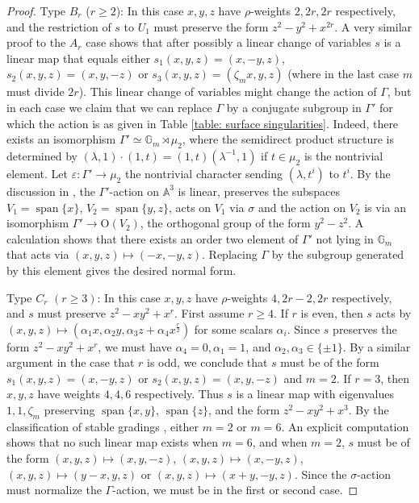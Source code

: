 \documentclass{article} %
\numberwithin{equation}{section}
\theoremstyle{definition}
\newcommand{\G}{\mathbb{G}}
\newcommand{\A}{\mathbb{A}}
\newcommand{\al}{\alpha}
\DeclareMathOperator{\spn}{span}
\newcommand{\rl}{r} %
\begin{document}
\begin{proof}
    
Type $B_\rl$ ($\rl \geq 2$):
In this case $x, y, z$ have $\rho$-weights $2, 2r, 2r$ respectively, and the restriction of $s$ to $U_1$ must preserve the form $z^2 - y^2 + x^{2r}$. 
A very similar proof to the $A_\rl$ case shows that after possibly a linear change of variables $s$ is a linear map that equals either $s_1(x,y,z) = (x,-y,z)$, $s_2(x,y,z) = (x,y,-z)$ or $s_3(x,y,z) = (\zeta_mx,y,z)$ (where in the last case $m$ must divide $2\rl$).
This linear change of variables might change the action of $\Gamma$, but in each case we claim that we can replace $\Gamma$ by a conjugate subgroup in $\Gamma'$ for which the action is as given in Table \ref{table: surface singularities}.
Indeed, there exists an isomorphism $\Gamma' \simeq\G_m \rtimes \mu_2$, where the semidirect product structure is determined by $(\lambda, 1) \cdot (1,t) = (1,t) (\lambda^{-1},1)$ if $t\in \mu_2$ is the nontrivial element.
Let $\varepsilon\colon \Gamma'\rightarrow \mu_2$ the nontrivial character sending $(\lambda, t^i)$ to $t^i$.
By the discussion in \cite[Section 8.4]{Slodowy-simplesingularitiesalggroups}, the $\Gamma'$-action on $\A^3$ is linear, preserves the subspaces $V_1=\spn\{x\}$, $V_2=\spn \{y,z\}$, acts on $V_1$ via $\sigma$ and the action on $V_2$ is via an isomorphism $\Gamma'\rightarrow \mathrm{O}(V_2)$, the orthogonal group of the form $y^2-z^2$. A calculation shows that there exists an order two element of $\Gamma'$ not lying in $\G_m$ that acts via $(x,y,z)\mapsto (-x,-y,z)$.
Replacing $\Gamma$ by the subgroup generated by this element gives the desired normal form. 

Type $C_\rl$ $(\rl\geq 3)$:
In this case $x, y, z$ have $\rho$-weights $4, 2r - 2, 2r$ respectively, and $s$ must preserve $z^2 - xy^2 + x^r$. First assume $r \geq 4$. If $r$ is even, then $s$ acts by $(x, y,z)\mapsto (\al_1 x,\al_2 y,\al_3 z + \al_4 x^{\frac{r}{2}})$ for some scalars $\alpha_i$.
Since $s$ preserves the form $z^2 - xy^2 + x^r$, we must have $\al_4 = 0, \al_1 = 1$, and $\al_2, \al_3 \in \{\pm 1\}$. 
By a similar argument in the case that $\rl$ is odd, we conclude that $s$ must be of the form 
$s_1(x,y,z) = (x,-y,z)$ or $s_2(x,y,z) = (x,y,-z)$ and $m=2$.
If $\rl=3$, then $x,y,z$ have weights $4,4,6$ respectively. 
Thus $s$ is a linear map with eigenvalues $1, 1, \zeta_m$ preserving $\spn\{x, y\}$, $\spn\{z\}$, and the form $z^2 - xy^2+ x^3$. 
By the classification of stable gradings \cite[\S7.2, Table 13]{GrossLevyReederYu-GradingsPosRank}, either $m=2$ or $m=6$.
    An explicit computation shows that no such linear map exists when $m=6$, and when $m=2$, $s$ must be of the form $(x, y, z) \mapsto (x, y, -z)$, $(x,y, z)\mapsto (x,-y, z)$, $(x,y, z)\mapsto (y-x,y, z)$ or $(x,y, z)\mapsto (x+y,-y, z)$. 
    Since the $\sigma$-action must normalize the $\Gamma$-action, we must be in the first or second case.


\end{proof}
\end{document}
